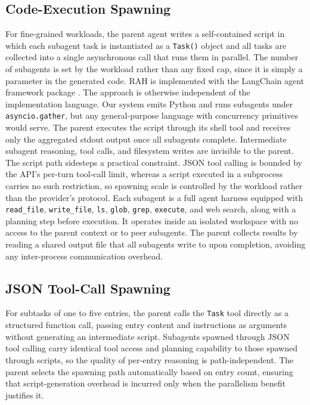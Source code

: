 \documentclass[sigconf,nonacm]{acmart}
\begin{document}
\subsection{Code-Execution Spawning}
\label{subsec:script}
For fine-grained workloads, the parent agent writes a self-contained script in which each subagent task is instantiated as a \texttt{Task()} object and all tasks are collected into a single asynchronous call that runs them in parallel. The number of subagents is set by the workload rather than any fixed cap, since it is simply a parameter in the generated code.
RAH is implemented with the LangChain agent framework package \cite{langchain2022}. The approach is otherwise independent of the implementation language. Our system emits Python and runs subagents under \texttt{asyncio.gather}, but any general-purpose language with concurrency primitives would serve.
The parent executes the script through its shell tool and receives only the aggregated stdout output once all subagents complete. Intermediate subagent reasoning, tool calls, and filesystem writes are invisible to the parent.
The script path sidesteps a practical constraint. JSON tool calling is bounded by the API's per-turn tool-call limit, whereas a script executed in a subprocess carries no such restriction, so spawning scale is controlled by the workload rather than the provider's protocol.
Each subagent is a full agent harness equipped with \texttt{read\_file}, \texttt{write\_file}, \texttt{ls}, \texttt{glob}, \texttt{grep}, \texttt{execute}, and web search, along with a planning step before execution. It operates inside an isolated workspace with no access to the parent context or to peer subagents.
The parent collects results by reading a shared output file that all subagents write to upon completion, avoiding any inter-process communication overhead.

\subsection{JSON Tool-Call Spawning}
\label{subsec:fc}
For subtasks of one to five entries, the parent calls the \texttt{Task} tool directly as a structured function call, passing entry content and instructions as arguments without generating an intermediate script.
Subagents spawned through JSON tool calling carry identical tool access and planning capability to those spawned through scripts, so the quality of per-entry reasoning is path-independent.
The parent selects the spawning path automatically based on entry count, ensuring that script-generation overhead is incurred only when the parallelism benefit justifies it.
\end{document}
